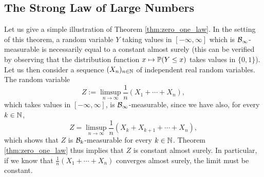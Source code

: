 \documentclass[../Main.tex]{subfiles}
\begin{document}
\subsection{The Strong Law of Large Numbers}



Let us give a simple illustration of Theorem \ref{thm:zero_one_law}. In the setting of this theorem, a random variable $Y$ taking values in $[-\infty,\infty]$ which is $\mathcal{B}_\infty$-measurable is necessarily equal to a constant almost surely (this can be verified by observing that the distribution function $x \mapsto \mathbb{P}(Y \le x)$ takes values in $\{0,1\}$). Let us then consider a sequence $(X_n)_{n \in \mathbb{N}}$ of independent real random variables. The random variable
\[
Z := \limsup_{n \to \infty} \frac{1}{n}(X_1 + \cdots + X_n),
\]
which takes values in $[-\infty,\infty]$, is $\mathcal{B}_\infty$-measurable, since we have also, for every $k \in \mathbb{N}$,
\[
Z = \limsup_{n \to \infty} \frac{1}{n}(X_k + X_{k+1} + \cdots + X_n),
\]
which shows that $Z$ is $\mathcal{B}_k$-measurable for every $k \in \mathbb{N}$. Theorem \ref{thm:zero_one_law} thus implies that $Z$ is constant almost surely. In particular, if we know that $\frac{1}{n}(X_1 + \cdots + X_n)$ converges almost surely, the limit must be constant.
\end{document}
